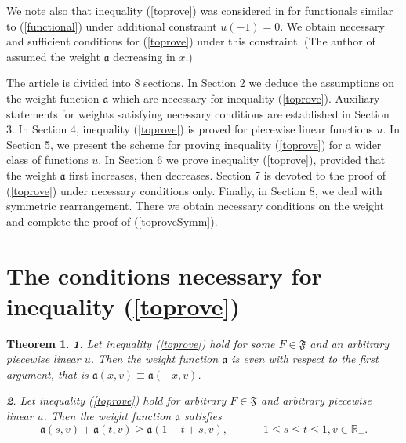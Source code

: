 \documentclass[12pt]{article}
\newcommand{\Real}{\mathbb R}
\renewcommand{\ge}{\geqslant}
\renewcommand{\le}{\leqslant}
\newtheorem{thm}{Theorem}
\begin{document}
We note also that inequality (\ref{toprove}) was considered in \cite{Lan}
for functionals similar to (\ref{functional}) under additional constraint $u(-1) = 0$.
We obtain necessary and sufficient conditions for (\ref{toprove}) under this constraint.
(The author of \cite{Lan} assumed the weight $\mathfrak a$ decreasing in $x$.)

The article is divided into 8 sections.
In Section 2 we deduce the assumptions on the weight function $\mathfrak a$ which are necessary for
inequality (\ref{toprove}).
Auxiliary statements for weights satisfying necessary conditions are established in Section 3.
In Section 4, inequality (\ref{toprove}) is proved for piecewise linear functions $u$.
In Section 5, we present the scheme for proving inequality (\ref{toprove}) for a wider class of
functions $u$.
In Section 6 we prove inequality (\ref{toprove}), provided that the weight $\mathfrak a$ first increases, 
then decreases.
Section 7 is devoted to the proof of (\ref{toprove}) under necessary conditions only.
Finally, in Section 8, we deal with symmetric rearrangement.
There we obtain necessary conditions on the weight and complete the proof of (\ref{toproveSymm}).

\section{The conditions necessary for inequality (\ref{toprove})}

\begin{thm}
\label{necessary}
{\bf 1}. Let inequality (\ref{toprove}) hold for some $F \in \mathfrak {F}$
and an arbitrary piecewise linear $u$. Then the weight function $\mathfrak a$ is even with respect to the first argument,
that is $\mathfrak a(x, v) \equiv \mathfrak a(-x, v)$.

{\bf 2}. Let inequality (\ref{toprove}) hold for arbitrary $F \in \mathfrak{F}$
and arbitrary piecewise linear $u$. Then the weight function $\mathfrak a$ satisfies
\begin{equation}
\label{almostConcave}
\mathfrak a(s, v) + \mathfrak a(t, v) \ge \mathfrak a(1 - t + s, v), \qquad -1 \le s \le t \le 1, v \in \Real_+.
\end{equation}
\end{thm}
\end{document}
